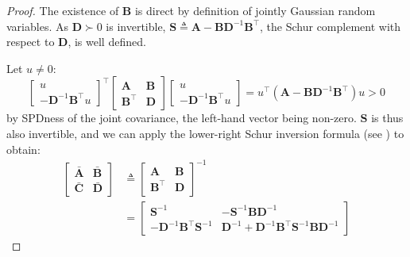 \begin{proof}
	The existence of $\mathbf{B}$ is direct by definition of jointly Gaussian random variables. As $\mathbf{D}\succ0$ is invertible, $\mathbf{S}\triangleq \mathbf{A}-\mathbf{B}\mathbf{D}^{-1}\mathbf{B}^\top$, the Schur complement with respect to $\mathbf{D}$, is well defined.

	Let $u\neq0$:
	\begin{equation}
		\begin{bmatrix}u\\-\mathbf{D}^{-1}\mathbf{B}^\top u\end{bmatrix}^\top\begin{bmatrix}\mathbf{A}&\mathbf{B}\\\mathbf{B}^\top&\mathbf{D}\end{bmatrix}\begin{bmatrix}u\\-\mathbf{D}^{-1}\mathbf{B}^\top u\end{bmatrix}=u^\top\left(\mathbf{A}-\mathbf{B}\mathbf{D}^{-1}\mathbf{B}^\top\right)u>0
	\end{equation}
	by SPDness of the joint covariance, the left-hand vector being non-zero. $\mathbf{S}$ is thus also invertible, and we can apply the lower-right Schur inversion formula (see ) to obtain:
	\begin{equation}
		\begin{aligned}
			\begin{bmatrix}\bar{\mathbf{A}}&\bar{\mathbf{B}}\\\bar{\mathbf{C}}&\bar{\mathbf{D}}\end{bmatrix}&\triangleq\begin{bmatrix}\mathbf{A}&\mathbf{B}\\\mathbf{B}^\top&\mathbf{D}\end{bmatrix}^{-1}\\
			&=\begin{bmatrix}\mathbf{S}^{-1}&-\mathbf{S}^{-1}\mathbf{B}\mathbf{D}^{-1}\\-\mathbf{D}^{-1}\mathbf{B}^\top \mathbf{S}^{-1}&\mathbf{D}^{-1}+\mathbf{D}^{-1}\mathbf{B}^\top \mathbf{S}^{-1}\mathbf{B}\mathbf{D}^{-1}\end{bmatrix}
			\end{aligned}
	\end{equation}


\end{proof}
